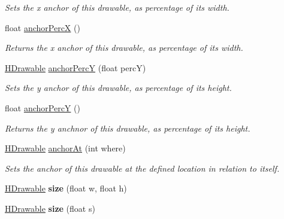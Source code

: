\begin{DoxyCompactItemize}
\begin{DoxyCompactList}\small\item\em Sets the x anchor of this drawable, as percentage of its width. \end{DoxyCompactList}\item 
float \hyperlink{classhype_1_1drawable_1_1_h_drawable_a4c0158fa8194cfe3424714f16e700b5e}{anchor\-Perc\-X} ()
\begin{DoxyCompactList}\small\item\em Returns the x anchor of this drawable, as percentage of its width. \end{DoxyCompactList}\item 
\hyperlink{classhype_1_1drawable_1_1_h_drawable}{H\-Drawable} \hyperlink{classhype_1_1drawable_1_1_h_drawable_ae376527282453c44731ec7cd31de5f76}{anchor\-Perc\-Y} (float perc\-Y)
\begin{DoxyCompactList}\small\item\em Sets the y anchor of this drawable, as percentage of its height. \end{DoxyCompactList}\item 
float \hyperlink{classhype_1_1drawable_1_1_h_drawable_ac46830b7986dfc9ad6ddbf923e939bc1}{anchor\-Perc\-Y} ()
\begin{DoxyCompactList}\small\item\em Returns the y anchnor of this drawable, as percentage of its height. \end{DoxyCompactList}\item 
\hyperlink{classhype_1_1drawable_1_1_h_drawable}{H\-Drawable} \hyperlink{classhype_1_1drawable_1_1_h_drawable_a6d95df0dfd78df98ac6036a30d73f411}{anchor\-At} (int where)
\begin{DoxyCompactList}\small\item\em Sets the anchor of this drawable at the defined location in relation to itself. \end{DoxyCompactList}\item 
\hypertarget{classhype_1_1drawable_1_1_h_drawable_a2d458cc012ce0421b443879baf054d0d}{\hyperlink{classhype_1_1drawable_1_1_h_drawable}{H\-Drawable} {\bfseries size} (float w, float h)}\label{classhype_1_1drawable_1_1_h_drawable_a2d458cc012ce0421b443879baf054d0d}

\item 
\hypertarget{classhype_1_1drawable_1_1_h_drawable_a249872347d0d2fca46d5cabee5d2c491}{\hyperlink{classhype_1_1drawable_1_1_h_drawable}{H\-Drawable} {\bfseries size} (float s)}\label{classhype_1_1drawable_1_1_h_drawable_a249872347d0d2fca46d5cabee5d2c491}


\end{DoxyCompactItemize}
